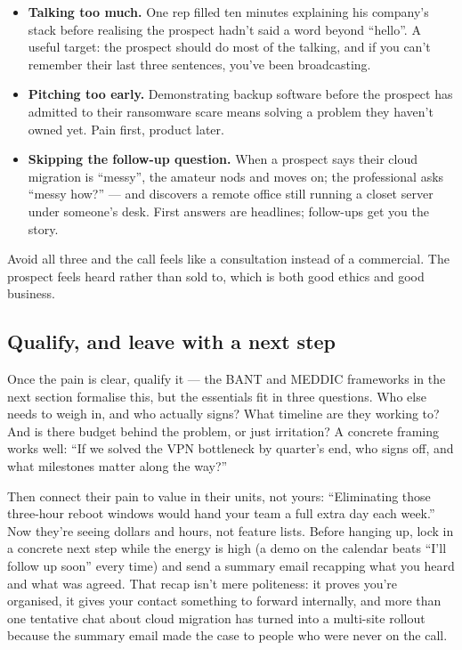 \begin{itemize}[leftmargin=*]
\item \textbf{Talking too much.} One rep filled ten minutes explaining his company's stack before realising the prospect hadn't said a word beyond ``hello''. A useful target: the prospect should do most of the talking, and if you can't remember their last three sentences, you've been broadcasting.
\item \textbf{Pitching too early.} Demonstrating backup software before the prospect has admitted to their ransomware scare means solving a problem they haven't owned yet. Pain first, product later.
\item \textbf{Skipping the follow-up question.} When a prospect says their cloud migration is ``messy'', the amateur nods and moves on; the professional asks ``messy how?'' — and discovers a remote office still running a closet server under someone's desk. First answers are headlines; follow-ups get you the story.
\end{itemize}

Avoid all three and the call feels like a consultation instead of a commercial. The prospect feels heard rather than sold to, which is both good ethics and good business.



\subsection{Qualify, and leave with a next step}


Once the pain is clear, qualify it — the BANT and MEDDIC frameworks in the next section formalise this, but the essentials fit in three questions. Who else needs to weigh in, and who actually signs? What timeline are they working to? And is there budget behind the problem, or just irritation? A concrete framing works well: ``If we solved the VPN bottleneck by quarter's end, who signs off, and what milestones matter along the way?''


Then connect their pain to value in their units, not yours: ``Eliminating those three-hour reboot windows would hand your team a full extra day each week.'' Now they're seeing dollars and hours, not feature lists. Before hanging up, lock in a concrete next step while the energy is high (a demo on the calendar beats ``I'll follow up soon'' every time) and send a summary email recapping what you heard and what was agreed. That recap isn't mere politeness: it proves you're organised, it gives your contact something to forward internally, and more than one tentative chat about cloud migration has turned into a multi-site rollout because the summary email made the case to people who were never on the call.



